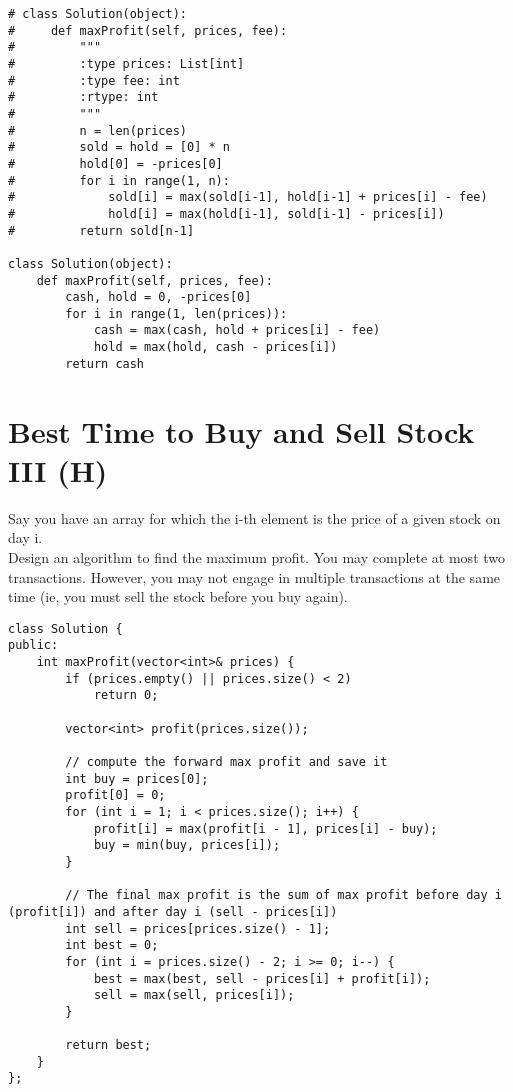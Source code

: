 \begin{lstlisting}
# class Solution(object):
#     def maxProfit(self, prices, fee):
#         """
#         :type prices: List[int]
#         :type fee: int
#         :rtype: int
#         """
#         n = len(prices)
#         sold = hold = [0] * n
#         hold[0] = -prices[0]
#         for i in range(1, n):
#             sold[i] = max(sold[i-1], hold[i-1] + prices[i] - fee)
#             hold[i] = max(hold[i-1], sold[i-1] - prices[i])
#         return sold[n-1]
    
class Solution(object):
    def maxProfit(self, prices, fee):
        cash, hold = 0, -prices[0]
        for i in range(1, len(prices)):
            cash = max(cash, hold + prices[i] - fee)
            hold = max(hold, cash - prices[i])
        return cash
\end{lstlisting}

\section{Best Time to Buy and Sell Stock III (H)}
Say you have an array for which the i-th element is the price of a given stock on day i. \\

Design an algorithm to find the maximum profit. You may complete at most two transactions. However, you may not engage in multiple transactions at the same time (ie, you must sell the stock before you buy again). \\

\begin{lstlisting}
class Solution {
public:
    int maxProfit(vector<int>& prices) {
        if (prices.empty() || prices.size() < 2)
            return 0;
        
        vector<int> profit(prices.size());
        
        // compute the forward max profit and save it
        int buy = prices[0];
        profit[0] = 0;
        for (int i = 1; i < prices.size(); i++) {
            profit[i] = max(profit[i - 1], prices[i] - buy);
            buy = min(buy, prices[i]);
        }
        
        // The final max profit is the sum of max profit before day i (profit[i]) and after day i (sell - prices[i])
        int sell = prices[prices.size() - 1];
        int best = 0;
        for (int i = prices.size() - 2; i >= 0; i--) {
            best = max(best, sell - prices[i] + profit[i]);
            sell = max(sell, prices[i]);
        }
        
        return best;   
    }
};
\end{lstlisting}


